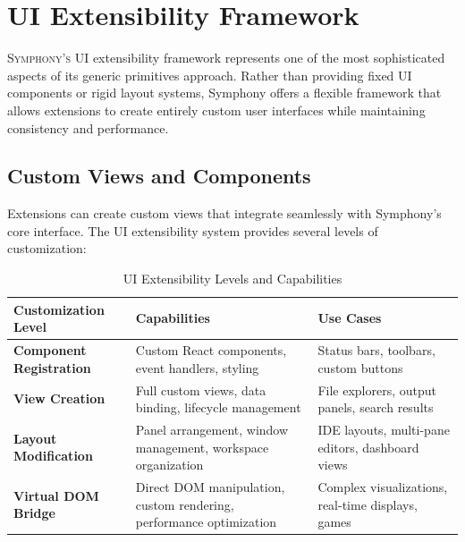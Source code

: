 
\section*{UI Extensibility Framework}

\lettrine{S}{ymphony's} UI extensibility framework represents one of the most sophisticated aspects of its generic primitives approach. Rather than providing fixed UI components or rigid layout systems, Symphony offers a flexible framework that allows extensions to create entirely custom user interfaces while maintaining consistency and performance.

\subsection*{Custom Views and Components}

Extensions can create custom views that integrate seamlessly with Symphony's core interface. The UI extensibility system provides several levels of customization:

\begin{table}[ht]
\centering
\begin{tabular}{@{}p{}p{}p{}@{}}
\toprule
\textbf{Customization Level} & \textbf{Capabilities} & \textbf{Use Cases} \\
\midrule
\textbf{Component Registration} & 
Custom React components, event handlers, styling & 
Status bars, toolbars, custom buttons \\
\midrule
\textbf{View Creation} & 
Full custom views, data binding, lifecycle management & 
File explorers, output panels, search results \\
\midrule
\textbf{Layout Modification} & 
Panel arrangement, window management, workspace organization & 
IDE layouts, multi-pane editors, dashboard views \\
\midrule
\textbf{Virtual DOM Bridge} & 
Direct DOM manipulation, custom rendering, performance optimization & 
Complex visualizations, real-time displays, games \\
\bottomrule
\end{tabular}
\caption{UI Extensibility Levels and Capabilities}
\end{table}

